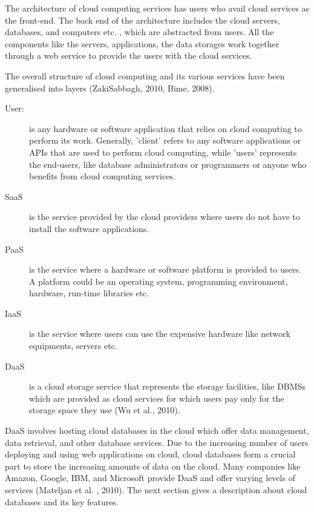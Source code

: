 The architecture of cloud computing services has users who avail cloud services
as the front-end.  The back end of the architecture includes the cloud servers,  
databases,   and computers etc. ,   which are abstracted from users.  All the
components like the servers,   applications,   the data storages work together
through a web service to provide the users with the cloud services. 

The overall structure of cloud computing and its various services have been
generalised into layers (ZakiSabbagh,   2010,   Bime,   2008). 

\begin{description}

	\item [User:] is any hardware or software application that relies on cloud
	computing to perform its work.  Generally,   'client' refers to any software applications or
	\acp{API}  that are used to perform cloud computing,  
	while 'users' represents the end-users,   like  database administrators or
	programmers or anyone who benefits from cloud computing services. 
	
	\item [\acf{SaaS}] is the service provided by the cloud
	providers where users do not have to install the software applications. 
	
	\item [\acf{PaaS}] is the service where a hardware or
	software platform is provided to users.  A platform could be an operating system,  
	programming environment,   hardware,   run-time libraries etc. 
	
	\item [\acf{IaaS}] is the service where users can use
	the expensive hardware like network equipments,   servers etc. 
	
	\item [\acf{DaaS}] is a cloud storage service  that represents
	the storage facilities,   like  \acp{DBMS} which are provided
	as cloud services for which users pay only for the storage space they use (Wu et
	al.,  2010). 

\end{description}


\ac{DaaS} involves hosting cloud databases in the cloud which offer data
management,   data retrieval,   and other database services.  Due to the
increasing number of users deploying and using web applications on cloud,  
cloud databases form a crucial part to store the increasing amounts of data
on the cloud.  Many companies like Amazon,   Google,   IBM,   and Microsoft
provide \ac{DaaS} and offer varying levels of services (Mateljan et al. ,  
2010). The next section gives a description about cloud databases and its key
features.

